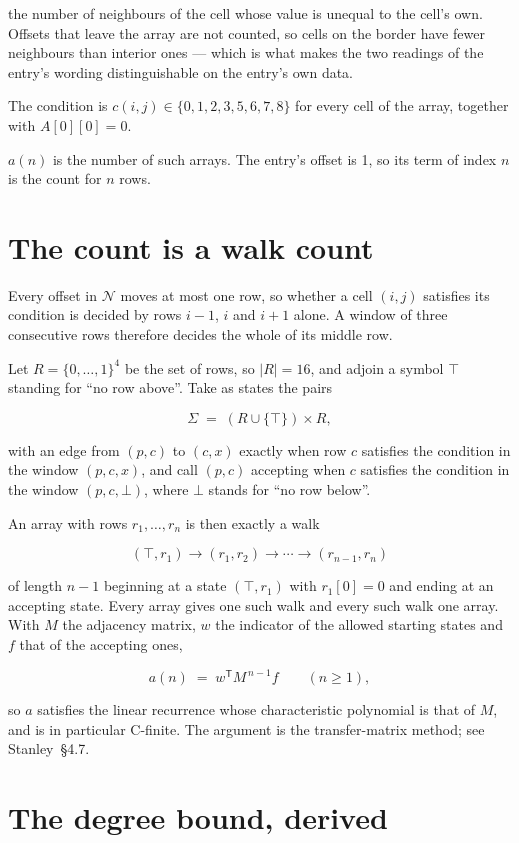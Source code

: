 \documentclass[11pt]{article}
\theoremstyle{definition}
\begin{document}
the number of neighbours of the cell whose value is unequal to the cell's own. Offsets that leave the array are not counted, so cells on the border have fewer neighbours than interior ones --- which is what makes the two readings of the entry's wording distinguishable on the entry's own data.

The condition is $c(i,j) \in \{0, 1, 2, 3, 5, 6, 7, 8\}$ for every cell of the array, together with $A[0][0]=0$.

$a(n)$ is the number of such arrays. The entry's offset is 1, so its term of index $n$ is the count for $n$ rows.

\section{The count is a walk count}

Every offset in $\mathcal{N}$ moves at most one row, so whether a cell $(i,j)$ satisfies its condition is decided by rows $i-1$, $i$ and $i+1$ alone. A window of three consecutive rows therefore decides the whole of its middle row.

Let $R = \{0,\dots,1\}^{4}$ be the set of rows, so $|R| = 16$, and adjoin a symbol $\top$ standing for ``no row above''. Take as states the pairs

\[\Sigma \;=\; (R \cup \{\top\}) \times R,\]

with an edge from $(p,c)$ to $(c,x)$ exactly when row $c$ satisfies the condition in the window $(p,c,x)$, and call $(p,c)$ accepting when $c$ satisfies the condition in the window $(p,c,\bot)$, where $\bot$ stands for ``no row below''.

An array with rows $r_1,\dots,r_n$ is then exactly a walk

\[(\top,r_1) \to (r_1,r_2) \to \cdots \to (r_{n-1},r_n)\]

of length $n-1$ beginning at a state $(\top,r_1)$ with $r_1[0]=0$ and ending at an accepting state. Every array gives one such walk and every such walk one array. With $M$ the adjacency matrix, $w$ the indicator of the allowed starting states and $f$ that of the accepting ones,

\[a(n) \;=\; w^{\mathsf T} M^{\,n-1} f \qquad (n \ge 1),\]

so $a$ satisfies the linear recurrence whose characteristic polynomial is that of $M$, and is in particular C-finite. The argument is the transfer-matrix method; see Stanley~\S4.7.

\section{The degree bound, derived}
\end{document}
